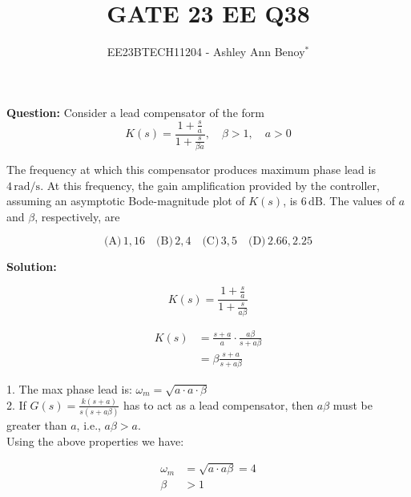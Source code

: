 \documentclass[journal,12pt,twocolumn]{IEEEtran}
\theoremstyle{remark}
\begin{document}
    
    \vspace{3cm}
    
    \title{GATE 23 EE Q38}
    \author{EE23BTECH11204 - Ashley Ann Benoy$^{*}$}%
    \maketitle
    \newpage
    \bigskip
    
    
    
    \textbf{Question: }
    Consider a lead compensator of the form
    \[ K(s) = \frac{1 + \frac{s}{a}}{1 + \frac{s}{\beta a}}, \quad \beta > 1, \quad a > 0 \]
    
    The frequency at which this compensator produces maximum phase lead is \(4 \, \text{rad/s}\). At this frequency, the gain amplification provided by the controller, assuming an asymptotic Bode-magnitude plot of \(K(s)\), is \(6 \, \text{dB}\). The values of \(a\) and \(\beta\), respectively, are
    
    \[
    \text{(A)} \, 1, 16 \quad
    \text{(B)} \, 2, 4 \quad
    \text{(C)} \, 3, 5 \quad
    \text{(D)} \, 2.66, 2.25
    \]
    
    \textbf{Solution:}
    \fi
    
   
    
    \[ K(s) = \frac{1 + \frac{s}{a}}{1 + \frac{s}{a\beta}} \]
    
    \begin{align}
    K(s) &= \frac{s + a}{a} \cdot \frac{a\beta}{s + a\beta} \\
    &= \beta \frac{s + a}{s + a\beta}
    \end{align}
    
    1. The max phase lead is: \(\omega_m = \sqrt{a \cdot a \cdot \beta}\)\\

    2. If \(G(s) = \frac{k(s+a)}{s(s+a\beta)}\) has to act as a lead compensator, then \(a\beta\) must be greater than \(a\), i.e., \(a\beta > a \).\\
    
  
    
    Using the above properties we have:
    
    \begin{align}
    \omega_m &= \sqrt{ a \cdot a \beta}=4 \\
    \beta &> 1
    \end{align}
    
\end{document}
